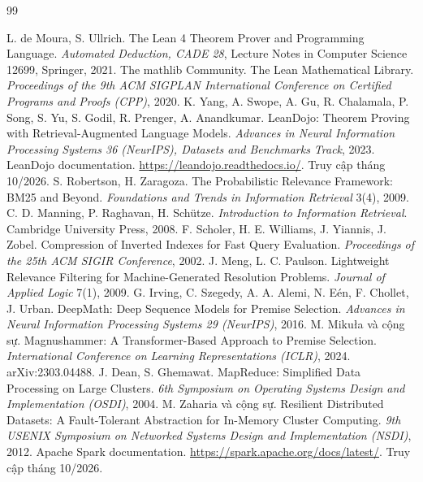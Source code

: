 \documentclass[11pt,a4paper,oneside]{report}
\begin{document}
\begingroup\small
\setlength{\itemsep}{1pt}
\begin{thebibliography}{99}
\setlength{\itemsep}{1pt}
 L. de Moura, S. Ullrich. The Lean 4 Theorem Prover and Programming Language. \emph{Automated
Deduction, CADE 28}, Lecture Notes in Computer Science 12699, Springer, 2021.
 The mathlib Community. The Lean Mathematical Library. \emph{Proceedings of the 9th ACM SIGPLAN
International Conference on Certified Programs and Proofs (CPP)}, 2020.
 K. Yang, A. Swope, A. Gu, R. Chalamala, P. Song, S. Yu, S. Godil, R. Prenger, A. Anandkumar.
LeanDojo: Theorem Proving with Retrieval-Augmented Language Models. \emph{Advances in Neural Information Processing
Systems 36 (NeurIPS), Datasets and Benchmarks Track}, 2023.
 LeanDojo documentation. \url{https://leandojo.readthedocs.io/}. Truy cập tháng 10/2026.
 S. Robertson, H. Zaragoza. The Probabilistic Relevance Framework: BM25 and Beyond.
\emph{Foundations and Trends in Information Retrieval} 3(4), 2009.
 C. D. Manning, P. Raghavan, H. Schütze. \emph{Introduction to Information Retrieval}. Cambridge
University Press, 2008.
 F. Scholer, H. E. Williams, J. Yiannis, J. Zobel. Compression of Inverted Indexes for Fast Query
Evaluation. \emph{Proceedings of the 25th ACM SIGIR Conference}, 2002.
 J. Meng, L. C. Paulson. Lightweight Relevance Filtering for Machine-Generated Resolution Problems.
\emph{Journal of Applied Logic} 7(1), 2009.
 G. Irving, C. Szegedy, A. A. Alemi, N. Eén, F. Chollet, J. Urban. DeepMath: Deep Sequence Models for
Premise Selection. \emph{Advances in Neural Information Processing Systems 29 (NeurIPS)}, 2016.
 M. Mikuła và cộng sự. Magnushammer: A Transformer-Based Approach to Premise Selection.
\emph{International Conference on Learning Representations (ICLR)}, 2024. arXiv:2303.04488.
 J. Dean, S. Ghemawat. MapReduce: Simplified Data Processing on Large Clusters. \emph{6th Symposium on
Operating Systems Design and Implementation (OSDI)}, 2004.
 M. Zaharia và cộng sự. Resilient Distributed Datasets: A Fault-Tolerant Abstraction for In-Memory
Cluster Computing. \emph{9th USENIX Symposium on Networked Systems Design and Implementation (NSDI)}, 2012.
 Apache Spark documentation. \url{https://spark.apache.org/docs/latest/}. Truy cập tháng 10/2026.

\end{thebibliography}
\end{document}
